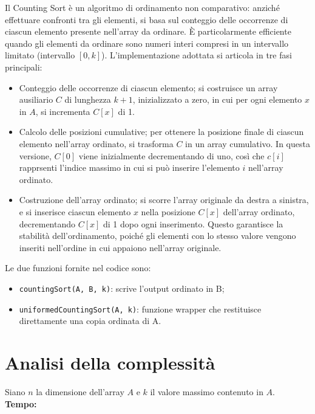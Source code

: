 \documentclass[a4paper, 12pt, oneside]{book}
\begin{document}
Il Counting Sort è un algoritmo di ordinamento non comparativo: anziché effettuare confronti tra gli elementi, si basa sul conteggio delle occorrenze di ciascun elemento presente nell'array da ordinare.
È particolarmente efficiente quando gli elementi da ordinare sono numeri interi compresi in un intervallo limitato (intervallo \([0, k]\)).
L'implementazione adottata si articola in tre fasi principali:

\begin{itemize}
    \item Conteggio delle occorrenze di ciascun elemento; si costruisce un array ausiliario \(C\) di lunghezza \(k+1\), inizializzato a zero, in cui per ogni elemento \(x\) in \(A\), si incrementa \(C[x]\) di 1.
    \item Calcolo delle posizioni cumulative; per ottenere la posizione finale di ciascun elemento nell'array ordinato, si trasforma \(C\) in un array cumulativo. In questa versione, \(C[0]\) viene inizialmente decrementando di uno, così che \(c[i]\) rapprsenti l'indice massimo in cui si può inserire l'elemento \(i\) nell'array ordinato.
    \item Costruzione dell'array ordinato; si scorre l'array originale da destra a sinistra, e si inserisce ciascun elemento \(x\) nella posizione \(C[x]\) dell'array ordinato, decrementando \(C[x]\) di 1 dopo ogni inserimento. Questo garantisce la stabilità dell'ordinamento, poiché gli elementi con lo stesso valore vengono inseriti nell'ordine in cui appaiono nell'array originale.
\end{itemize}

\noindent Le due funzioni fornite nel codice sono:

\begin{itemize}
    \item \texttt{countingSort(A, B, k)}: scrive l'output ordinato in B;
    \item \texttt{uniformedCountingSort(A, k)}: funzione wrapper che restituisce direttamente una copia ordinata di A.
\end{itemize}

\section{Analisi della complessità}

Siano \(n\) la dimensione dell'array \(A\) e \(k\) il valore massimo contenuto in \(A\). \\

\noindent \textbf{Tempo:}
\end{document}
